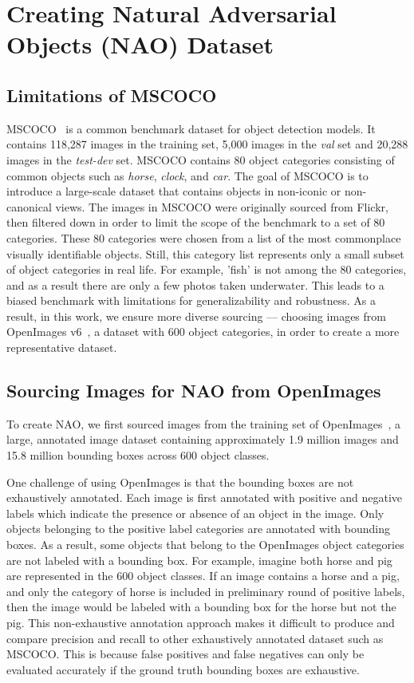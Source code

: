 \documentclass[final]{cvpr}
\begin{document}
\section{Creating Natural Adversarial Objects (NAO) Dataset}

\subsection{Limitations of MSCOCO} \label{subsection:limitation_of_mscoco}
MSCOCO~\cite{lin2014microsoft} is a common benchmark dataset for object detection models.
It contains 118,287 images in the training set, 5,000 images in the \textit{val} set and 20,288 images in the \textit{test-dev} set. MSCOCO contains 80 object categories consisting of common objects such as \textit{horse}, \textit{clock}, and \textit{car}.
The goal of MSCOCO is to introduce a large-scale dataset that contains objects in non-iconic or non-canonical views.
The images in MSCOCO were originally sourced from Flickr, then filtered down in order to limit the scope of the benchmark to a set of 80 categories.
These 80 categories were chosen from a list of the most commonplace visually identifiable objects.  Still, this category list represents only a small subset of object categories in real life.
For example, 'fish' is not among the 80 categories, and as a result there are only a few photos taken underwater.
This leads to a biased benchmark with limitations for generalizability and robustness.
As a result, in this work, we ensure more diverse sourcing --- choosing images from OpenImages v6~\cite{Kuznetsova2018-bk}, a dataset with 600 object categories, in order to create a more representative dataset.

\subsection{Sourcing Images for NAO from OpenImages}
To create NAO, we first sourced images from the training set of OpenImages~\cite{Kuznetsova2018-bk}, a large, annotated image dataset containing approximately 1.9 million images and 15.8 million bounding boxes across 600 object classes.

One challenge of using OpenImages is that the bounding boxes are not exhaustively annotated. Each image is first annotated with positive and negative labels which indicate the presence or absence of an object in the image.
Only objects belonging to the positive label categories are annotated with bounding boxes.
As a result, some objects that belong to the OpenImages object categories are not labeled with a bounding box. 
For example, imagine both horse and pig are represented in the 600 object classes. If an image contains a horse and a pig, and only the category of horse is included in preliminary round of positive labels, then the image would be labeled with a bounding box for the horse but not the pig.
This non-exhaustive annotation approach makes it difficult to produce and compare precision and recall to other exhaustively annotated dataset such as MSCOCO. This is because false positives and false negatives can only be evaluated accurately if the ground truth bounding boxes are exhaustive. 
\end{document}
